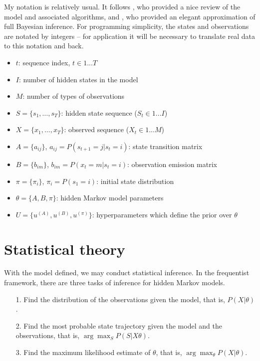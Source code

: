 \documentclass{article}
\newcommand{\argmax}{\arg\max}   %
\begin{document}
My notation is relatively
usual.  It  follows \cite{rabiner-juang:1986},
who provided a nice review of the model and associated algorithms,
and \cite{mackay:1996}, who provided an elegant approximation of
full Bayesian inference.  For programming simplicity, the states
and observations are notated by integers -- for application it will be
necessary to translate real data to this notation and back.

\begin{itemize}
\item $t$:  sequence index, $t \in 1...T$
\item $I$: number of hidden states in the model
\item $M$: number of types of observations
\item $S = \{ s_1,\dots,s_T \}$: hidden state sequence ($S_t \in 1...I$)
\item $X = \{ x_1,\dots,x_T \}$: observed sequence ($X_t \in 1...M$)
\item $A = \{ a_{ij} \}$, $a_{ij} = P(s_{t+1} = j | s_{t} = i)$: state
  transition matrix
\item $B = \{ b_{im} \}$, $b_{im} = P(x_{t} = m | s_{t} = i)$:
  observation emission matrix
\item $\pi = \{ \pi_{i} \}$, $\pi_i = P(s_1 = i)$: initial state
  distribution
\item $\theta = \{ A, B, \pi \}$: hidden Markov model parameters
\item $U = \{u^{(A)}, u^{(B)}, u^{(\pi)} \}$: hyperparameters which
  define the prior over $\theta$
\end{itemize}

\section{Statistical theory}
With the model defined, we may conduct statistical inference.
In the frequentist framework, there are three tasks of inference
for hidden Markov models.
\begin{enumerate}
\item[1.] Find the distribution of the observations given the model, that
  is, $P(X|\theta  )$.
\item[2.] Find the most probable state trajectory given the model and the
  observations, that is, $\argmax_{S} P(S|X \theta  )$.
\item[3.] Find the maximum likelihood estimate of $\theta$, that is,
$\argmax_{\theta} P(X|\theta )$.
\end{enumerate}
\end{document}
